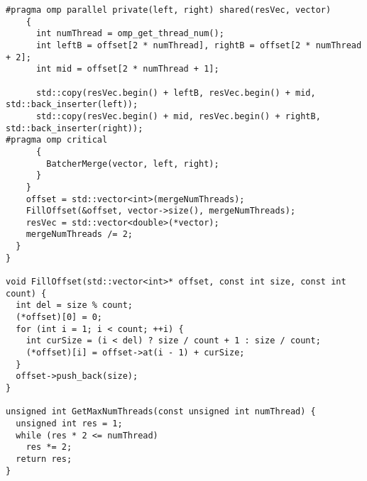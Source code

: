 \documentclass{report}
\begin{document}
\begin{lstlisting}
#pragma omp parallel private(left, right) shared(resVec, vector)
    {
      int numThread = omp_get_thread_num();
      int leftB = offset[2 * numThread], rightB = offset[2 * numThread + 2];
      int mid = offset[2 * numThread + 1];

      std::copy(resVec.begin() + leftB, resVec.begin() + mid, std::back_inserter(left));
      std::copy(resVec.begin() + mid, resVec.begin() + rightB, std::back_inserter(right));
#pragma omp critical
      {
        BatcherMerge(vector, left, right);
      }
    }
    offset = std::vector<int>(mergeNumThreads);
    FillOffset(&offset, vector->size(), mergeNumThreads);
    resVec = std::vector<double>(*vector);
    mergeNumThreads /= 2;
  }
}

void FillOffset(std::vector<int>* offset, const int size, const int count) {
  int del = size % count;
  (*offset)[0] = 0;
  for (int i = 1; i < count; ++i) {
    int curSize = (i < del) ? size / count + 1 : size / count;
    (*offset)[i] = offset->at(i - 1) + curSize;
  }
  offset->push_back(size);
}

unsigned int GetMaxNumThreads(const unsigned int numThread) {
  unsigned int res = 1;
  while (res * 2 <= numThread)
    res *= 2;
  return res;
}
\end{lstlisting}
\end{document}
